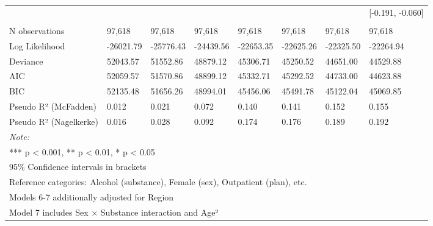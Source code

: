 \documentclass[
  spanish,
  10pt,
]{article}
\begin{document}
\begin{table}[H]
{\begin{tabular}[t]{llllllll}
 &  &  &  &  &  &  & {}[-0.191, -0.060]\\
\addlinespace[0.3em]
\multicolumn{8}{l}{\textbf{Model statistics}}\\
\hspace{1em}N observations & 97,618 & 97,618 & 97,618 & 97,618 & 97,618 & 97,618 & 97,618\\
\hspace{1em}Log Likelihood & -26021.79 & -25776.43 & -24439.56 & -22653.35 & -22625.26 & -22325.50 & -22264.94\\
\hspace{1em}Deviance & 52043.57 & 51552.86 & 48879.12 & 45306.71 & 45250.52 & 44651.00 & 44529.88\\
\hspace{1em}AIC & 52059.57 & 51570.86 & 48899.12 & 45332.71 & 45292.52 & 44733.00 & 44623.88\\
\hspace{1em}BIC & 52135.48 & 51656.26 & 48994.01 & 45456.06 & 45491.78 & 45122.04 & 45069.85\\
\hspace{1em}Pseudo R² (McFadden) & 0.012 & 0.021 & 0.072 & 0.140 & 0.141 & 0.152 & 0.155\\
\hspace{1em}Pseudo R² (Nagelkerke) & 0.016 & 0.028 & 0.092 & 0.174 & 0.176 & 0.189 & 0.192\\
\bottomrule
\multicolumn{8}{l}{\rule{0pt}{1em}\textit{Note: }}\\
\multicolumn{8}{l}{\rule{0pt}{1em}*** p < 0.001, ** p < 0.01, * p < 0.05}\\
\multicolumn{8}{l}{\rule{0pt}{1em}95\% Confidence intervals in brackets}\\
\multicolumn{8}{l}{\rule{0pt}{1em}Reference categories: Alcohol (substance), Female (sex), Outpatient (plan), etc.}\\
\multicolumn{8}{l}{\rule{0pt}{1em}Models 6-7 additionally adjusted for Region}\\
\multicolumn{8}{l}{\rule{0pt}{1em}Model 7 includes Sex × Substance interaction and Age²}\\
\end{tabular}}
\end{table}
\end{document}
